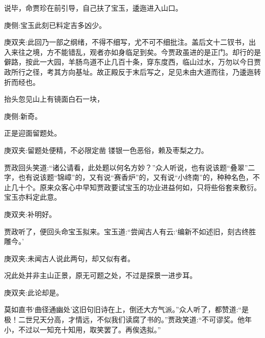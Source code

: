 \begin{parag}
    说毕，命贾珍在前引导，自己扶了宝玉，逶迤进入山口。\begin{note}庚侧:宝玉此刻已料定吉多凶少。\end{note}\begin{note}庚双夹:此回乃一部之纲绪，不得不细写，尤不可不细批注。盖后文十二钗书，出入来往之境，方不能错乱，观者亦如身临足到矣。今贾政虽进的是正门。却行的是僻路，按此一大园，羊肠鸟道不止几百十条，穿东度西，临山过水，万勿以今日贾政所行之径，考其方向基址。故正殿反于末后写之，足见未由大道而往，乃逶迤转折而经也。\end{note}抬头忽见山上有镜面白石一块，\begin{note}庚侧:新奇。\end{note}正是迎面留题处。\begin{note}庚双夹:留题处便精，不必限定凿 镂银一色恶俗，赖及枣梨之力。\end{note}贾政回头笑道:“诸公请看，此处题以何名方妙？”众人听说，也有说该题“叠翠”二字，也有说该题“锦嶂”的，又有说“赛香炉”的，又有说“小终南”的，种种名色，不止几十个。原来众客心中早知贾政要试宝玉的功业进益何如，只将些俗套来敷衍。宝玉亦料定此意。\begin{note}庚双夹:补明好。\end{note}贾政听了，便回头命宝玉拟来。宝玉道:“尝闻古人有云:‘编新不如述旧，刻古终胜雕今。’\begin{note}庚双夹:未闻古人说此两句，却又似有者。\end{note}况此处并非主山正景，原无可题之处，不过是探景一进步耳。\begin{note}庚双夹:此论却是。\end{note}莫如直书‘曲径通幽处’这旧句旧诗在上，倒还大方气派。”众人听了，都赞道:“是极！二世兄天分高，才情远，不似我们读腐了书的。”贾政笑道:“不可谬奖。他年小，不过以一知充十知用，取笑罢了。再俟选拟。”
\end{parag}


